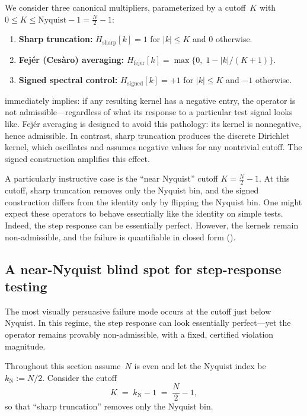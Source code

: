 \documentclass[11pt,a4paper]{article}
\theoremstyle{plain}
\theoremstyle{definition}
\theoremstyle{plain}
\begin{document}
We consider three canonical multipliers, parameterized by a cutoff~$K$ with
$0 \le K \le \mathrm{Nyquist}-1 = \tfrac{N}{2}-1$:

\begin{enumerate}[label=(\arabic*),leftmargin=2em]
  \item \textbf{Sharp truncation:}\;
    $H_{\mathrm{sharp}}[k] = 1$ for $|k| \le K$ and $0$ otherwise.
  \item \textbf{Fej\'er (Ces\`aro) averaging:}\;
    $H_{\mathrm{fejer}}[k] = \max\{0,\; 1 - |k|/(K+1)\}$.
  \item \textbf{Signed spectral control:}\;
    $H_{\mathrm{signed}}[k] = +1$ for $|k| \le K$ and $-1$ otherwise.
\end{enumerate}

 immediately implies: if any resulting kernel has a negative
entry, the operator is not admissible---regardless of what its response to a
particular test signal looks like.  Fej\'er averaging is designed to avoid this
pathology: its kernel is nonnegative, hence admissible.  In contrast, sharp
truncation produces the discrete Dirichlet kernel, which oscillates and assumes
negative values for any nontrivial cutoff.  The signed construction amplifies
this effect.

A particularly instructive case is the ``near Nyquist'' cutoff
$K = \tfrac{N}{2}-1$.  At this cutoff, sharp truncation removes only the
Nyquist bin, and the signed construction differs from the identity only by
flipping the Nyquist bin.  One might expect these operators to behave essentially
like the identity on simple tests.  Indeed, the step response can be essentially
perfect.  However, the kernels remain non-admissible, and the failure is
quantifiable in closed form ().


\subsection{A near-Nyquist blind spot for step-response testing}
\label{sec:near-nyquist}

The most visually persuasive failure mode occurs at the cutoff just below
Nyquist.  In this regime, the step response can look essentially perfect---yet
the operator remains provably non-admissible, with a fixed, certified violation
magnitude.

Throughout this section assume~$N$ is even and let the Nyquist index be
$k_{\mathrm{N}} := N/2$.  Consider the cutoff
\[
  K \;=\; k_{\mathrm{N}} - 1 \;=\; \frac{N}{2} - 1,
\]
so that ``sharp truncation'' removes only the Nyquist bin.
\end{document}
